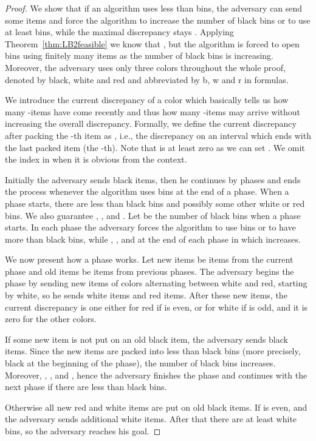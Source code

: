 \documentclass[11pt,a4paper]{article}
\begin{document}
\begin{proof}
We show that if an algorithm uses less than  bins,
the adversary can send some items and force the algorithm to increase the
number of black bins or to use at least  bins,
while the maximal discrepancy stays .
Applying Theorem~\ref{thm:LB2feasible} we know that ,
but the algorithm is forced to open  bins using
finitely many items as the number of black bins is increasing.
Moreover, the adversary uses only three colors throughout the whole proof, denoted by black, white and red
and abbreviated by b, w and r in formulas.

We introduce the current discrepancy of a color  which basically tells us how many -items
have come recently and thus how many -items may arrive without increasing the overall discrepancy.
Formally, we define the current discrepancy after packing the -th item as
,
i.e., the discrepancy on an interval which ends with the last packed item (the -th).
Note that  is at least zero as we can set .
We omit the  index in  when it is obvious from the context.

Initially the adversary sends  black items, then he continues by phases and
ends the process whenever the algorithm uses  bins at the end of a phase.
When a phase starts, there are less than 
black bins and possibly some other white or red bins.
We also guarantee ,
, and . 
Let  be the number of black bins when a phase starts.
In each phase the adversary forces the algorithm to use  bins
or to have more than  black bins,
while , , and
 at the end of each phase in which  increases.

We now present how a phase works. Let new items be items from the current phase and
old items be items from previous phases.
The adversary begins the phase by sending  new items of colors alternating between
white and red, starting by white, so he sends 
white items and  red items.
After these new items, the current discrepancy is one either for red if  is even,
or for white if  is odd, and it is zero for the other colors.

If some new item is not put on an old black item, 
the adversary sends  black items. Since the new items are packed into less
than  black bins (more precisely, black at the beginning of the phase),
the number of black bins increases. Moreover, ,
, and ,
hence the adversary finishes the phase and continues with the next phase if there are
less than  black bins.

Otherwise all new red and white items are put on old black items. If
 is even,  and the adversary sends additional 
white items. After that there are at least  white bins, so the adversary
reaches his goal.


\end{proof}
\end{document}
